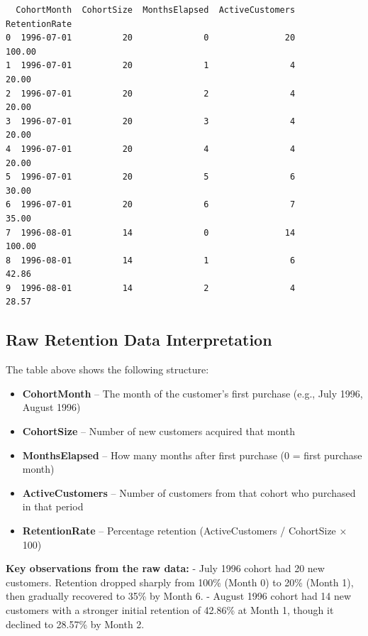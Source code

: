 \documentclass[
  letterpaper,
  DIV=11,
  numbers=noendperiod]{scrartcl}
\providecommand{\tightlist}{%
  \setlength{\itemsep}{0pt}\setlength{\parskip}{0pt}}\usepackage{longtable,booktabs,array}
\begin{document}
\begin{verbatim}
  CohortMonth  CohortSize  MonthsElapsed  ActiveCustomers  RetentionRate
0  1996-07-01          20              0               20         100.00
1  1996-07-01          20              1                4          20.00
2  1996-07-01          20              2                4          20.00
3  1996-07-01          20              3                4          20.00
4  1996-07-01          20              4                4          20.00
5  1996-07-01          20              5                6          30.00
6  1996-07-01          20              6                7          35.00
7  1996-08-01          14              0               14         100.00
8  1996-08-01          14              1                6          42.86
9  1996-08-01          14              2                4          28.57
\end{verbatim}

\subsection{Raw Retention Data
Interpretation}\label{raw-retention-data-interpretation}

The table above shows the following structure:

\begin{itemize}
\tightlist
\item
  \textbf{CohortMonth} -- The month of the customer's first purchase
  (e.g., July 1996, August 1996)
\item
  \textbf{CohortSize} -- Number of new customers acquired that month
\item
  \textbf{MonthsElapsed} -- How many months after first purchase (0 =
  first purchase month)
\item
  \textbf{ActiveCustomers} -- Number of customers from that cohort who
  purchased in that period
\item
  \textbf{RetentionRate} -- Percentage retention (ActiveCustomers /
  CohortSize × 100)
\end{itemize}

\textbf{Key observations from the raw data:} - July 1996 cohort had 20
new customers. Retention dropped sharply from 100\% (Month 0) to 20\%
(Month 1), then gradually recovered to 35\% by Month 6. - August 1996
cohort had 14 new customers with a stronger initial retention of 42.86\%
at Month 1, though it declined to 28.57\% by Month 2.
\end{document}
